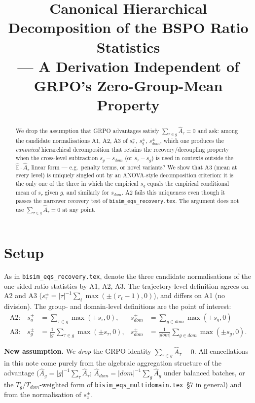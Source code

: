 \documentclass[11pt]{article}
\title{Canonical Hierarchical Decomposition of the BSPO Ratio Statistics \\
\large --- A Derivation Independent of GRPO's Zero-Group-Mean Property}
\author{}
\date{}
\newcommand{\Ehat}{\widehat{\mathbb{E}}}
\begin{document}
\maketitle

\begin{abstract}
We drop the assumption that GRPO advantages satisfy
$\sum_{\tau\in g}\hat A_\tau = 0$ and ask: among the candidate
normalisations A1, A2, A3 of $s_\tau^\pm$, $s_g^\pm$, $s_{dom}^\pm$, which
one produces the \emph{canonical} hierarchical decomposition that retains
the recovery/decoupling property when the cross-level subtraction
$s_g - s_{dom}$ (or $s_\tau - s_g$) is used in contexts outside the
$\Ehat\cdot\hat A_\tau$ linear form --- e.g.\ penalty terms, or novel
variants? We show that A3 (mean at every level) is uniquely singled out by
an ANOVA-style decomposition criterion: it is the only one of the three in
which the empirical $s_g$ equals the empirical conditional mean of
$s_\tau$ given $g$, and similarly for $s_{dom}$. A2 fails this uniqueness
even though it passes the narrower recovery test of
\texttt{bisim\_eqs\_recovery.tex}. The argument does not use
$\sum_{\tau\in g}\hat A_\tau=0$ at any point.
\end{abstract}

\section{Setup}

As in \texttt{bisim\_eqs\_recovery.tex}, denote the three candidate
normalisations of the one-sided ratio statistics by A1, A2, A3. The
trajectory-level definition agrees on A2 and A3
($s_\tau^\pm = |\tau|^{-1}\sum_t\max(\pm(r_t-1),0)$), and differs on A1
(no division). The group- and domain-level definitions are the point of
interest:
\begin{align*}
\text{A2:}\quad s_g^\pm &= \sum_{\tau\in g}\max(\pm s_\tau,0),
  & s_{dom}^\pm &= \sum_{g\in dom}\max(\pm s_g,0) \\
\text{A3:}\quad s_g^\pm &= \tfrac{1}{|g|}\sum_{\tau\in g}\max(\pm s_\tau,0),
  & s_{dom}^\pm &= \tfrac{1}{|dom|}\sum_{g\in dom}\max(\pm s_g,0).
\end{align*}

\textbf{New assumption.} We \emph{drop} the GRPO identity
$\sum_{\tau\in g}\hat A_\tau = 0$. All cancellations in this note come
purely from the algebraic aggregation structure of the advantage
($\hat A_g = |g|^{-1}\sum_\tau\hat A_\tau$;
$\hat A_{dom} = |dom|^{-1}\sum_g\hat A_g$ under balanced batches, or the
$T_g/T_{dom}$-weighted form of \texttt{bisim\_eqs\_multidomain.tex}~\S7
in general) and from the normalisation of $s_z^\pm$.
\end{document}
